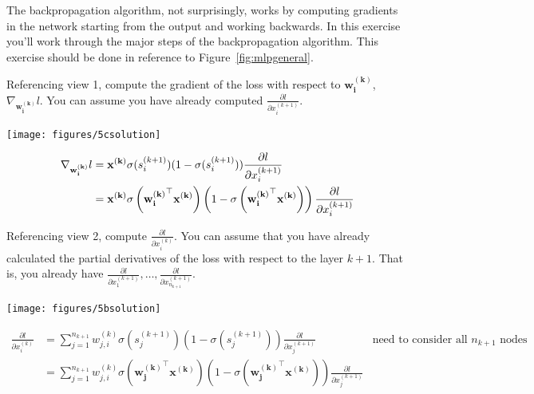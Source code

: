 \documentclass[assignment06_Solutions]{subfiles}
\begin{document}
\begin{exercise}[(75 minutes)]
The backpropagation algorithm, not surprisingly, works by computing gradients in the network starting from the output and working backwards.  In this exercise you'll work through the major steps of the backpropagation algorithm.  This exercise should be done in reference to Figure~\ref{fig:mlpgeneral}.
\bes


\item Referencing view 1, compute the gradient of the loss with respect to $\mathbf{w^{(k)}_i}$, $\nabla_{\mathbf{w^{(k)}_i}} l$.  You can assume you have already computed $\frac{\partial l}{\partial x^{(k+1)}_i}$.
\begin{boxedsolution}
\begin{center}
\texttt{[image: figures/5csolution]}
\end{center}
\begin{align}
\nabla_{\mathbf{w^{(k)}_i}} l &= \mathbf{x^{(k)}} \sigma(s_i^{(k+1)}) (1 - \sigma(s_i^{(k+1)}))\frac{\partial l}{\partial x_i^{(k+1)}} \\
&=  \mathbf{x^{(k)}} \sigma\left (\mathbf{w_i^{(k)}}^\top \mathbf{x^{(k)}} \right )\left (1-\sigma\left (\mathbf{w_i^{(k)}}^\top \mathbf{x^{(k)}} \right )\right) \frac{\partial l}{\partial x_i^{(k+1)}}
\end{align}
\end{boxedsolution}

\item Referencing view 2, compute $\frac{\partial l}{\partial x^{(k)}_i}$.  You can assume that you have already calculated the partial derivatives of the loss with respect to the layer $k+1$.  That is, you already have $\frac{\partial l}{\partial x^{(k+1)}_1}, \ldots, \frac{\partial l}{\partial x^{(k+1)}_{n_{k+1}}}$.

\begin{boxedsolution}
\begin{center}
\texttt{[image: figures/5bsolution]}
\end{center}
\begin{align}
\frac{\partial l}{\partial x^{(k)}_i} &= \sum_{j=1}^{n_{k+1}} w^{(k)}_{j,i} \sigma \left (s^{(k+1)}_{j} \right) \left (1-\sigma \left (s^{(k+1)}_{j} \right)\right) \frac{\partial l}{\partial x^{(k+1)}_j}&  \mbox{need to consider all $n_{k+1}$ nodes} \nonumber \\
&= \sum_{j=1}^{n_{k+1}} w^{(k)}_{j,i} \sigma \left ( \mathbf{w_j^{(k)}}^\top \mathbf{x^{(k)}} \right) \left (1-\sigma \left ( \mathbf{w_j^{(k)}}^\top \mathbf{x^{(k)}}\right)\right) \frac{\partial l}{\partial x^{(k+1)}_j}
\end{align}
\end{boxedsolution}


\end{exercise}
\end{document}
